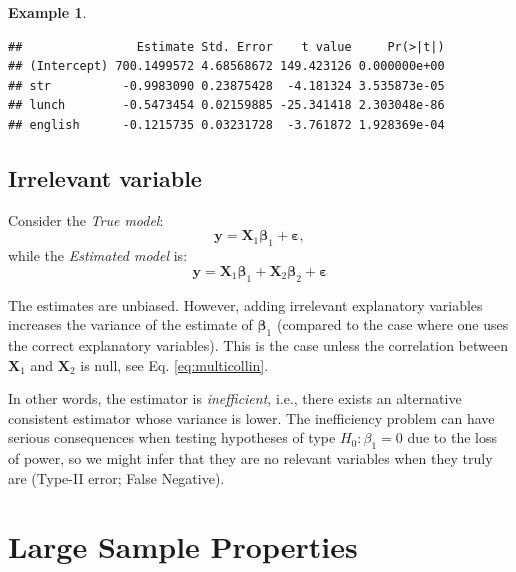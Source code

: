 \documentclass[
]{book}
\newenvironment{Shaded}{\begin{snugshade}}{\end{snugshade}}
\newcommand{\AttributeTok}[1]{\textcolor[rgb]{0.77,0.63,0.00}{#1}}
\newcommand{\FunctionTok}[1]{\textcolor[rgb]{0.00,0.00,0.00}{#1}}
\newcommand{\NormalTok}[1]{#1}
\newcommand{\OtherTok}[1]{\textcolor[rgb]{0.56,0.35,0.01}{#1}}
\newcommand{\SpecialCharTok}[1]{\textcolor[rgb]{0.00,0.00,0.00}{#1}}
\theoremstyle{definition}
\theoremstyle{definition}
\newtheorem{example}{Example}[chapter]
\theoremstyle{definition}
\theoremstyle{definition}
\theoremstyle{remark}
\begin{document}
\begin{example}
\begin{Shaded}
\end{Shaded}

\begin{verbatim}
##                Estimate Std. Error    t value     Pr(>|t|)
## (Intercept) 700.1499572 4.68568672 149.423126 0.000000e+00
## str          -0.9983090 0.23875428  -4.181324 3.535873e-05
## lunch        -0.5473454 0.02159885 -25.341418 2.303048e-86
## english      -0.1215735 0.03231728  -3.761872 1.928369e-04
\end{verbatim}

\end{example}

\hypertarget{irrelevant-variable}{%
\subsection{Irrelevant variable}\label{irrelevant-variable}}

Consider the \emph{True model}:
\[
\mathbf{y} = \mathbf{X}_1\boldsymbol\beta_1 + \boldsymbol\varepsilon,
\]
while the \emph{Estimated model} is:
\[
\mathbf{y} = \mathbf{X}_1\boldsymbol\beta_1 + \mathbf{X}_2\boldsymbol\beta_2 + \boldsymbol\varepsilon
\]

The estimates are unbiased. However, adding irrelevant explanatory variables increases the variance of the estimate of \(\boldsymbol\beta_1\) (compared to the case where one uses the correct explanatory variables). This is the case unless the correlation between \(\mathbf{X}_1\) and \(\mathbf{X}_2\) is null, see Eq. \eqref{eq:multicollin}.

In other words, the estimator is \emph{inefficient}, i.e., there exists an alternative consistent estimator whose variance is lower. The inefficiency problem can have serious consequences when testing hypotheses of type \(H_0: \beta_1 = 0\) due to the loss of power, so we might infer that they are no relevant variables when they truly are (Type-II error; False Negative).

\hypertarget{large-sample-properties}{%
\section{Large Sample Properties}\label{large-sample-properties}}
\end{document}
